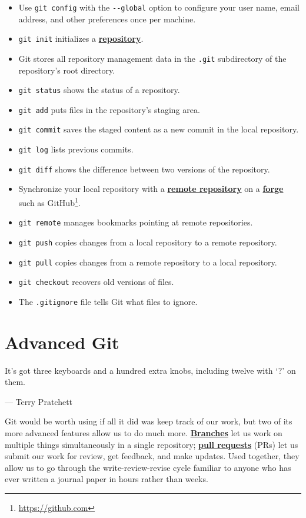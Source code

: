 \documentclass[
]{krantz}
\providecommand{\tightlist}{%
  \setlength{\itemsep}{0pt}\setlength{\parskip}{0pt}}
\renewenvironment{quote}{\begin{VF}}{\end{VF}}
\renewcommand{\href}[2]{#2\footnote{\url{#1}}}
\newcommand{\gref}[2]{\hyperlink{#2}{\textbf{#1}}}
\begin{document}
\begin{itemize}
\tightlist
\item
  Use \texttt{git\ config} with the \texttt{-\/-global} option to configure your user name,
  email address, and other preferences once per machine.
\item
  \texttt{git\ init} initializes a \gref{repository}{repository}.
\item
  Git stores all repository management data in the \texttt{.git} subdirectory of the repository's root directory.
\item
  \texttt{git\ status} shows the status of a repository.
\item
  \texttt{git\ add} puts files in the repository's staging area.
\item
  \texttt{git\ commit} saves the staged content as a new commit in the local repository.
\item
  \texttt{git\ log} lists previous commits.
\item
  \texttt{git\ diff} shows the difference between two versions of the repository.
\item
  Synchronize your local repository with a \gref{remote repository}{remote\_repository}
  on a \gref{forge}{forge} such as \href{https://github.com}{GitHub}.
\item
  \texttt{git\ remote} manages bookmarks pointing at remote repositories.
\item
  \texttt{git\ push} copies changes from a local repository to a remote repository.
\item
  \texttt{git\ pull} copies changes from a remote repository to a local repository.
\item
  \texttt{git\ checkout} recovers old versions of files.
\item
  The \texttt{.gitignore} file tells Git what files to ignore.
\end{itemize}

\hypertarget{git-advanced}{%
\chapter{Advanced Git}\label{git-advanced}}

\begin{quote}
It's got three keyboards and a hundred extra knobs, including twelve with `?' on them.

--- Terry Pratchett
\end{quote}

Git would be worth using if all it did was keep track of our work,
but two of its more advanced features allow us to do much more.
\gref{Branches}{git\_branch} let us work on multiple things simultaneously in a single repository;
\gref{pull requests}{pull\_request} (PRs) let us submit our work for review,
get feedback,
and make updates.
Used together,
they allow us to go through the write-review-revise cycle
familiar to anyone who has ever written a journal paper
in hours rather than weeks.
\end{document}
